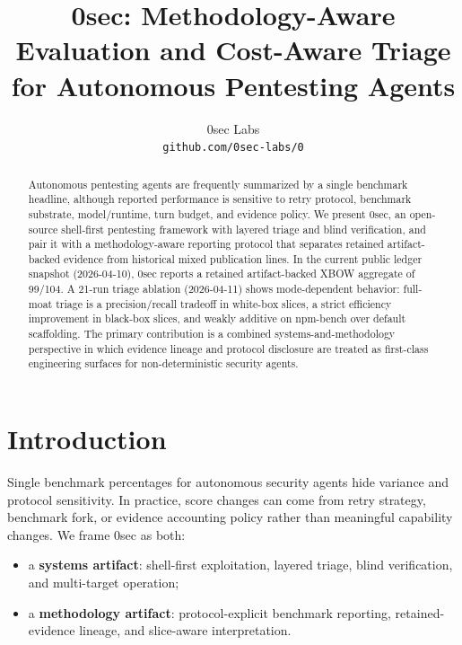 \documentclass[11pt]{article}
\title{0sec: Methodology-Aware Evaluation and Cost-Aware Triage for Autonomous Pentesting Agents}
\author{
  0sec Labs \\
  \texttt{github.com/0sec-labs/0}
}
\date{}
\begin{document}
\maketitle

\begin{abstract}
Autonomous pentesting agents are frequently summarized by a single benchmark
headline, although reported performance is sensitive to retry protocol,
benchmark substrate, model/runtime, turn budget, and evidence policy. We
present 0sec, an open-source shell-first pentesting framework with layered
triage and blind verification, and pair it with a methodology-aware reporting
protocol that separates retained artifact-backed evidence from historical mixed
publication lines. In the current public ledger snapshot (2026-04-10), 0sec
reports a retained artifact-backed XBOW aggregate of 99/104. A 21-run triage
ablation (2026-04-11) shows mode-dependent behavior: full-moat triage is a
precision/recall tradeoff in white-box slices, a strict efficiency improvement
in black-box slices, and weakly additive on npm-bench over default scaffolding.
The primary contribution is a combined systems-and-methodology perspective in
which evidence lineage and protocol disclosure are treated as first-class
engineering surfaces for non-deterministic security agents.
\end{abstract}

\section{Introduction}

Single benchmark percentages for autonomous security agents hide variance and
protocol sensitivity. In practice, score changes can come from retry strategy,
benchmark fork, or evidence accounting policy rather than meaningful capability
changes. We frame 0sec as both:

\begin{itemize}[leftmargin=*]
  \item a \textbf{systems artifact}: shell-first exploitation, layered triage,
  blind verification, and multi-target operation;
  \item a \textbf{methodology artifact}: protocol-explicit benchmark reporting,
  retained-evidence lineage, and slice-aware interpretation.
\end{itemize}
\end{document}
